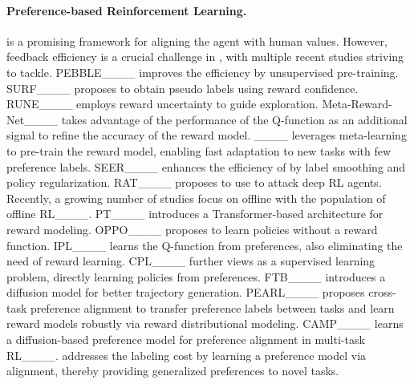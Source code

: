 \paragraph{Preference-based Reinforcement Learning.}

\PbRL is a promising framework for aligning the agent with human values. However, feedback efficiency is a crucial challenge in \pbRL, with multiple recent studies striving to tackle. PEBBLE____ improves the efficiency by unsupervised pre-training. SURF____ proposes to obtain pseudo labels using reward confidence. RUNE____ employs reward uncertainty to guide exploration. Meta-Reward-Net____ takes advantage of the performance of the Q-function as an additional signal to refine the accuracy of the reward model. ____ leverages meta-learning to pre-train the reward model, enabling fast adaptation to new tasks with few preference labels. SEER____ enhances the efficiency of \pbRL by label smoothing and policy regularization. RAT____ proposes to use \pbRL to attack deep RL agents.
Recently, a growing number of studies focus on offline \pbRL with the population of offline RL____.
PT____ introduces a Transformer-based architecture for reward modeling. OPPO____ proposes to learn policies without a reward function. IPL____ learns the Q-function from preferences, also eliminating the need of reward learning. CPL____ further views \pbRL as a supervised learning problem, directly learning policies from preferences. FTB____ introduces a diffusion model for better trajectory generation. PEARL____ proposes cross-task preference alignment to transfer preference labels between tasks and learn reward models robustly via reward distributional modeling. CAMP____ learns a diffusion-based preference model for preference alignment in multi-task RL____.
\ourmethod addresses the labeling cost by learning a \vl preference model via \vl alignment, thereby providing generalized preferences to novel tasks.